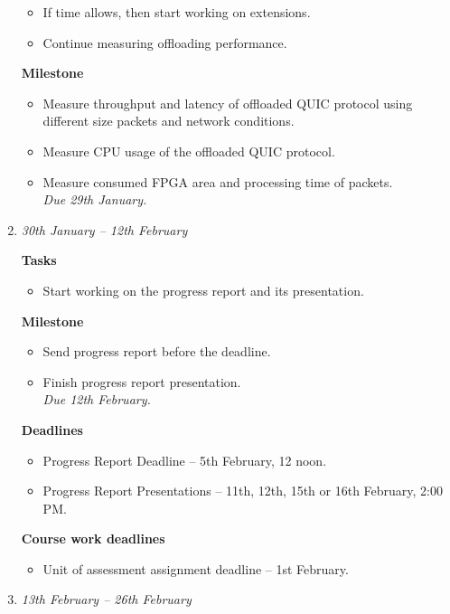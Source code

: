 \documentclass[a4paper,12pt]{article}
\begin{document}
\begin{enumerate}
\begin{itemize}
 \item If time allows, then start working on extensions.
 \item Continue measuring offloading performance.
 \end{itemize}

\textbf{Milestone}
 \begin{itemize}
  \item Measure throughput and latency of offloaded QUIC protocol using different size packets and network conditions.
  \item Measure CPU usage of the offloaded QUIC protocol.
  \item Measure consumed FPGA area and processing time of packets.\\
 \emph{ Due 29th January. }
 \end{itemize}
  



 \item 
 \emph{30th January -- 12th February}

\textbf{Tasks}
 \begin{itemize}
 \item Start working on the progress report and its presentation.
 \end{itemize}

\textbf{Milestone}
 \begin{itemize}
  \item Send progress report before the deadline.
  \item Finish progress report presentation.\\
 \emph{ Due 12th February. }
 \end{itemize}

 \textbf{Deadlines}
 \begin{itemize}
  \item Progress Report Deadline -- 5th February, 12 noon.
  \item Progress Report Presentations -- 11th, 12th, 15th or 16th February, 2:00 PM.
 \end{itemize}

 \textbf{Course work deadlines}
 \begin{itemize}
  \item Unit of assessment assignment deadline -- 1st February.
 \end{itemize} 
 



 \item 
 \emph{13th February -- 26th February}


\end{enumerate}
\end{document}
